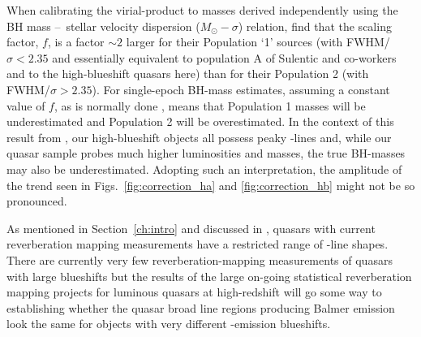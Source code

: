 When calibrating the virial-product to masses derived independently using the BH mass \---\ stellar velocity dispersion ($M_\odot-\sigma$) relation, \citet{collin06} find that the scaling factor, $f$, is a factor $\sim2$ larger for their Population `1' sources (with FWHM/$\sigma < 2.35$ and essentially equivalent to population A of Sulentic and co-workers and to the high-blueshift quasars here) than for their Population 2 (with FWHM/$\sigma > 2.35$). 
For single-epoch BH-mass estimates, assuming a constant value of $f$, as is normally done \citep[e.g.][]{vestergaard06}, means that Population 1 masses will be underestimated and Population 2 will be overestimated.
In the context of this result from \citet{collin06}, our high-blueshift objects all possess peaky \hans-lines and, while our quasar sample probes much higher luminosities and masses, the true BH-masses may also be underestimated.
Adopting such an interpretation, the amplitude of the trend seen in Figs.~\ref{fig:correction_ha} and \ref{fig:correction_hb} might not be so pronounced.

As mentioned in Section~\ref{ch:intro} and discussed in \citet{richards11}, quasars with current reverberation mapping measurements have a restricted range of -line shapes. 
There are currently very few reverberation-mapping measurements of quasars with large  blueshifts but the results of the large on-going statistical reverberation mapping projects \citep[e.g.][]{shen15} for luminous quasars at high-redshift will go some way to establishing whether the quasar broad line regions producing Balmer emission look the same for objects with very different -emission blueshifts. 

